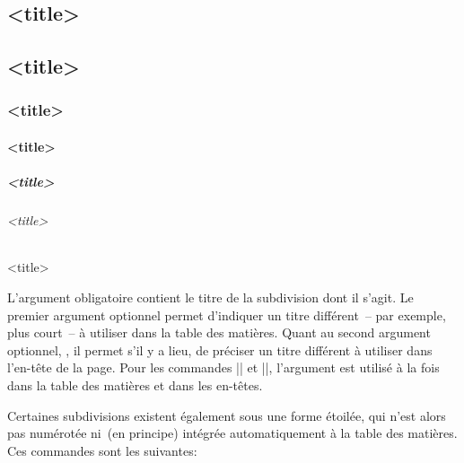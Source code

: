 \begin{macro}
\part{<title>}%
\chapter[<toc-title>][<head-title>]{<title>}%
\section[<toc-title>][<head-title>]{<title>}%
\subsection[<toc-title>][<head-title>]{<title>}%
\subsubsection[<toc-title>][<head-title>]{<title>}%
\paragraph[<toc-title>][<head-title>]{<title>}%
\subparagraph[<toc-title>][<head-title>]{<title>}%
\end{macro}

L'argument obligatoire  contient le titre de la subdivision dont il s'agit. Le premier argument optionnel  permet d'indiquer un titre différent~-- par exemple, plus court~-- à utiliser dans la table des matières. Quant au second argument optionnel, , il permet s'il y a lieu, de préciser un titre différent à utiliser dans l'en-tête de la page. Pour les commandes |\heading| et |\subheading|, l'argument  est utilisé à la fois dans la table des matières et dans les en-têtes.

Certaines subdivisions existent également sous une forme étoilée, qui n'est alors pas numérotée ni~(en principe) intégrée automatiquement à la table des matières. Ces commandes sont les suivantes:


